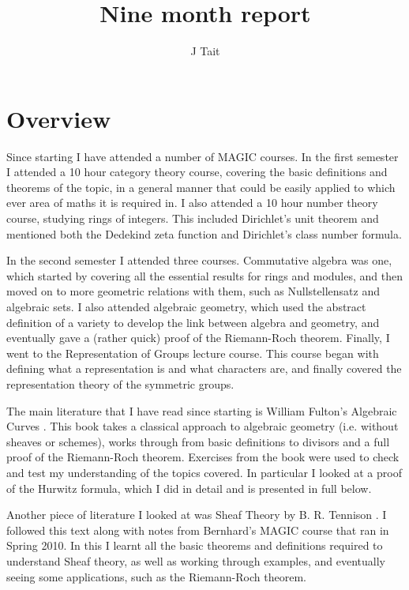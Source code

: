 \documentclass[11pt]{article} %
\title{Nine month report}
\author{J Tait}
\begin{document}
\maketitle

\section{Overview}

Since starting I have attended a number of MAGIC courses. In the first semester I attended a 10 hour category theory course, covering the basic definitions and theorems of the topic, in a general manner that could be easily applied to which ever area of maths it is required in. I also attended a 10 hour number theory course, studying rings of integers. This included Dirichlet's unit theorem and mentioned both the  Dedekind zeta function and Dirichlet's class number formula.

In the second semester I attended three courses. Commutative algebra was one, which started by covering all the essential results for rings and modules, and then moved on to more geometric relations with them, such as Nullstellensatz and algebraic sets. I also attended algebraic geometry, which used the abstract definition of a variety to develop the link between algebra and geometry, and eventually gave a (rather quick) proof of the Riemann-Roch theorem. Finally, I went to the Representation of Groups lecture course. This course began with defining what a representation is and what characters are, and finally covered the representation theory of the symmetric groups.

The main literature that I have read since starting is William Fulton's Algebraic Curves \citep{fulton}. This book takes a classical approach to algebraic geometry (i.e. without sheaves or schemes),  works through from basic definitions to divisors and a full proof of the Riemann-Roch theorem. Exercises from the book were used to check and test my understanding of the topics covered. In particular I looked at a proof of the Hurwitz formula, which I did in detail and is presented in full below.

Another piece of literature I looked at was Sheaf Theory by B. R. Tennison \citep{tennison}. I followed this text along with notes from Bernhard's MAGIC course that ran in Spring 2010. In this I learnt all the basic theorems and definitions required to understand Sheaf theory, as well as working through examples, and eventually seeing some applications, such as the Riemann-Roch theorem.
\end{document}
